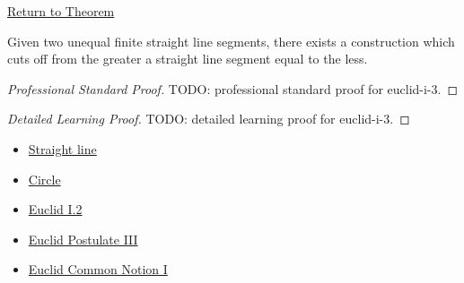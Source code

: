 \newpage
{}
\label{prf:euclid-i-3}

\begin{remark*}[Return]
\hyperref[thm:euclid-i-3]{Return to Theorem}
\end{remark*}

\begin{theorem*}
Given two unequal finite straight line segments, there exists a construction
which cuts off from the greater a straight line segment equal to the less.
\end{theorem*}

\begin{proof}[Professional Standard Proof]
\LRAProofBodyStart
TODO: professional standard proof for euclid-i-3.
\end{proof}

\begin{proof}[Detailed Learning Proof]
\LRAProofBodyStart
TODO: detailed learning proof for euclid-i-3.
\end{proof}

\begin{remark*}
\end{remark*}

\begin{dependencies}
\begin{itemize}
  \item \hyperref[def-euclid-straight-line]{Straight line}
  \item \hyperref[def-euclid-circle]{Circle}
  \item \hyperref[thm:euclid-i-2]{Euclid I.2}
  \item \hyperref[ax-euclid-postulate-describe-circle]{Euclid Postulate III}
  \item \hyperref[ax-euclid-common-notion-things-equal-to-same]{Euclid Common Notion I}
\end{itemize}
\end{dependencies}

\clearpage
